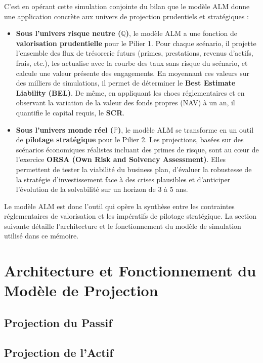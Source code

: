 C'est en opérant cette simulation conjointe du bilan que le modèle ALM donne une application concrète aux univers de projection prudentiels et stratégiques :

\begin{itemize}
    \item \textbf{Sous l'univers risque neutre ($\mathbb{Q}$)}, le modèle ALM a une fonction de \textbf{valorisation prudentielle} pour le Pilier 1. Pour chaque scénario, il projette l'ensemble des flux de trésorerie futurs (primes, prestations, revenus d'actifs, frais, etc.), les actualise avec la courbe des taux sans risque du scénario, et calcule une valeur présente des engagements. En moyennant ces valeurs sur des milliers de simulations, il permet de déterminer le \textbf{Best Estimate Liability (BEL)}. De même, en appliquant les chocs réglementaires et en observant la variation de la valeur des fonds propres (NAV) à un an, il quantifie le capital requis, le \textbf{SCR}.
    
    \item \textbf{Sous l'univers monde réel ($\mathbb{P}$)}, le modèle ALM se transforme en un outil de \textbf{pilotage stratégique} pour le Pilier 2. Les projections, basées sur des scénarios économiques réalistes incluant des primes de risque, sont au cœur de l'exercice \textbf{ORSA (Own Risk and Solvency Assessment)}. Elles permettent de tester la viabilité du business plan, d'évaluer la robustesse de la stratégie d'investissement face à des crises plausibles et d'anticiper l'évolution de la solvabilité sur un horizon de 3 à 5 ans.
\end{itemize}

Le modèle ALM est donc l'outil qui opère la synthèse entre les contraintes réglementaires de valorisation et les impératifs de pilotage stratégique. La section suivante détaille l'architecture et le fonctionnement du modèle de simulation utilisé dans ce mémoire.

\section{Architecture et Fonctionnement du Modèle de Projection}
    \subsection{Projection du Passif}
    \subsection{Projection de l'Actif}
